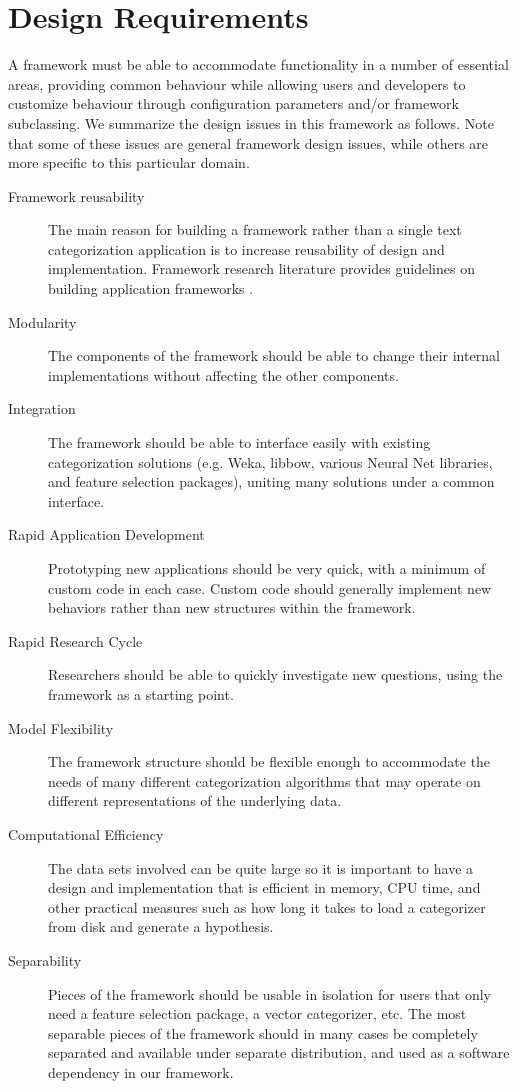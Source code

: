 \documentclass[a4paper,twocolumn]{article}
\begin{document}
\section{Design Requirements}

A framework must be able to accommodate functionality in a number of essential areas, providing common behaviour while allowing users and developers to customize behaviour through configuration parameters and/or framework subclassing.  We summarize the design issues in this framework as follows.  Note that some of these issues are general framework design issues, while others are more specific to this particular domain.

\begin{description}
\item[Framework reusability] The main reason for building a framework rather than a single text categorization application is to increase reusability of design and implementation.  Framework research literature provides guidelines on building application frameworks \cite{fayad:99}.
\item[Modularity] The components of the framework should be able to change their internal implementations without affecting the other components.
\item[Integration] The framework should be able to interface easily with existing categorization solutions (e.g. Weka, libbow, various Neural Net libraries, and feature selection packages), uniting many solutions under a common interface.
\item[Rapid Application Development] Prototyping new applications should be very quick, with a minimum of custom code in each case.  Custom code should generally implement new behaviors rather than new structures within the framework.
\item[Rapid Research Cycle] Researchers should be able to quickly investigate new questions, using the framework as a starting point.
\item[Model Flexibility] The framework structure should be flexible enough to accommodate the needs of many different categorization algorithms that may operate on different representations of the underlying data.
\item[Computational Efficiency] The data sets involved can be quite large so it is important to have a design and implementation that is efficient in memory, CPU time, and other practical measures such as how long it takes to load a categorizer from disk and generate a hypothesis.
\item[Separability] Pieces of the framework should be usable in isolation for users that only need a feature selection package, a vector categorizer, etc.  The most separable pieces of the framework should in many cases be completely separated and available under separate distribution, and used as a software dependency in our framework.
\end{description}
\end{document}
